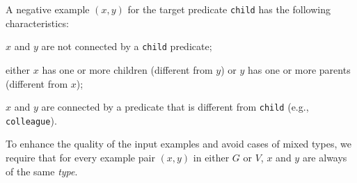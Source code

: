 %
%
\begin{example}
	A negative example $(x,y)$ for the target predicate \texttt{child} has the following characteristics:
	\begin{inparaenum}[\itshape(i)]
		\item $x$ and $y$ are not connected by a \texttt{child} predicate;
		\item either $x$ has one or more children (different from $y$) or $y$ has one or more parents (different from $x$);
		\item $x$ and $y$ are connected by a predicate that is different from \texttt{child} (e.g., \texttt{colleague}).
	\end{inparaenum}
\end{example}

To enhance the quality of the input examples and avoid cases of mixed types, 
we require that for every example pair $(x,y)$ in either $G$ or $V$, $x$ and $y$ are always of the same \emph{type}. 


